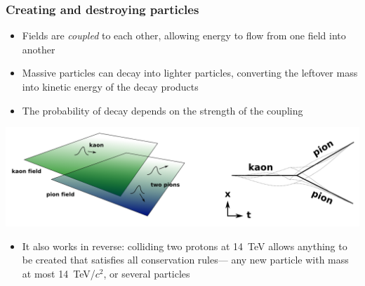 \documentclass[compress]{beamer}
\begin{document}
\begin{frame}
\frametitle{Creating and destroying particles}

\begin{itemize}
\item Fields are {\it coupled} to each other, allowing energy to flow
  from one field into another
\item Massive particles can decay into lighter particles, converting
  the leftover mass into kinetic energy of the decay products
\item The probability of decay depends on the strength of the coupling
\end{itemize}

\includegraphics[width=\linewidth]{ktopipi_fields.png}

\begin{itemize}
\item It also works in reverse: colliding two protons at 14~TeV allows
  anything to be created that satisfies all conservation rules--- any
  new particle with mass at most 14~TeV/$c^2$, or several particles
\end{itemize}
\end{frame}
\end{document}
